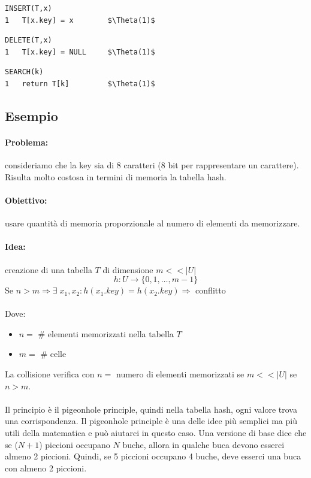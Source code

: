 \begin{mdframed}
\begin{lstlisting}[mathescape=true]
INSERT(T,x)
1   T[x.key] = x        $\Theta(1)$
\end{lstlisting}
\end{mdframed}
\begin{mdframed}
\begin{lstlisting}[mathescape=true]
DELETE(T,x)
1   T[x.key] = NULL     $\Theta(1)$
\end{lstlisting}
\end{mdframed}
\begin{mdframed}
    \begin{lstlisting}[mathescape=true]
SEARCH(k)
1   return T[k]         $\Theta(1)$
\end{lstlisting}
\end{mdframed}

\newpage
\subsection{Esempio}
\paragraph{Problema:} consideriamo che la key sia di 8 caratteri (8 bit per rappresentare un carattere). Risulta molto costosa in termini di memoria la tabella hash.
\paragraph{Obiettivo:} usare quantità di memoria proporzionale al numero di elementi da memorizzare.
\paragraph{Idea:} creazione di una tabella $T$ di dimensione $m << |U|$
\begin{equation*}
    h: U \rightarrow \{0, 1, \dots, m-1\}
\end{equation*}
Se $n>m \Rightarrow \exists\; x_1,x_2:h(x_1.key) = h(x_2.key) \Rightarrow$ conflitto \\~\\
Dove:
\begin{itemize}
    \item $n = $ \# elementi memorizzati nella tabella $T$
    \item $m = $ \# celle
\end{itemize}

La collisione verifica con $n = $ numero di elementi memorizzati se $m <<|U|$ se $n > m$. \\~\\

Il principio è il pigeonhole principle, quindi nella tabella hash, ogni valore trova una corrispondenza. 
Il pigeonhole principle è una delle idee più semplici ma più utili della matematica e può aiutarci in questo caso. 
Una versione di base dice che se ($N+1$) piccioni occupano $N$ buche, allora in qualche buca devono esserci almeno 2 piccioni. 
Quindi, se 5 piccioni occupano 4 buche, deve esserci una buca con almeno 2 piccioni.
